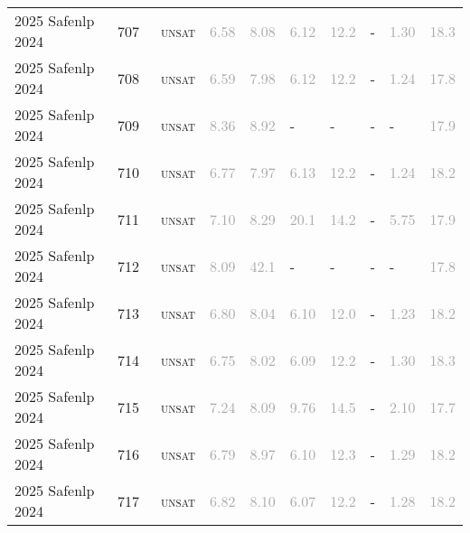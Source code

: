 \begin{center}
{\begin{longtable}{@{}llllllllll@{}}
2025 Safenlp 2024 & 707 & ~\textsc{unsat} & \textcolor{darkgray}{6.58} & \textcolor{darkgray}{8.08} & \textcolor{darkgray}{6.12} & \textcolor{darkgray}{12.2} & - & \textcolor{darkgray}{1.30} & \textcolor{darkgray}{18.3} \\
2025 Safenlp 2024 & 708 & ~\textsc{unsat} & \textcolor{darkgray}{6.59} & \textcolor{darkgray}{7.98} & \textcolor{darkgray}{6.12} & \textcolor{darkgray}{12.2} & - & \textcolor{darkgray}{1.24} & \textcolor{darkgray}{17.8} \\
2025 Safenlp 2024 & 709 & ~\textsc{unsat} & \textcolor{darkgray}{8.36} & \textcolor{darkgray}{8.92} & - & - & - & - & \textcolor{darkgray}{17.9} \\
2025 Safenlp 2024 & 710 & ~\textsc{unsat} & \textcolor{darkgray}{6.77} & \textcolor{darkgray}{7.97} & \textcolor{darkgray}{6.13} & \textcolor{darkgray}{12.2} & - & \textcolor{darkgray}{1.24} & \textcolor{darkgray}{18.2} \\
2025 Safenlp 2024 & 711 & ~\textsc{unsat} & \textcolor{darkgray}{7.10} & \textcolor{darkgray}{8.29} & \textcolor{darkgray}{20.1} & \textcolor{darkgray}{14.2} & - & \textcolor{darkgray}{5.75} & \textcolor{darkgray}{17.9} \\
2025 Safenlp 2024 & 712 & ~\textsc{unsat} & \textcolor{darkgray}{8.09} & \textcolor{darkgray}{42.1} & - & - & - & - & \textcolor{darkgray}{17.8} \\
2025 Safenlp 2024 & 713 & ~\textsc{unsat} & \textcolor{darkgray}{6.80} & \textcolor{darkgray}{8.04} & \textcolor{darkgray}{6.10} & \textcolor{darkgray}{12.0} & - & \textcolor{darkgray}{1.23} & \textcolor{darkgray}{18.2} \\
2025 Safenlp 2024 & 714 & ~\textsc{unsat} & \textcolor{darkgray}{6.75} & \textcolor{darkgray}{8.02} & \textcolor{darkgray}{6.09} & \textcolor{darkgray}{12.2} & - & \textcolor{darkgray}{1.30} & \textcolor{darkgray}{18.3} \\
2025 Safenlp 2024 & 715 & ~\textsc{unsat} & \textcolor{darkgray}{7.24} & \textcolor{darkgray}{8.09} & \textcolor{darkgray}{9.76} & \textcolor{darkgray}{14.5} & - & \textcolor{darkgray}{2.10} & \textcolor{darkgray}{17.7} \\
2025 Safenlp 2024 & 716 & ~\textsc{unsat} & \textcolor{darkgray}{6.79} & \textcolor{darkgray}{8.97} & \textcolor{darkgray}{6.10} & \textcolor{darkgray}{12.3} & - & \textcolor{darkgray}{1.29} & \textcolor{darkgray}{18.2} \\
2025 Safenlp 2024 & 717 & ~\textsc{unsat} & \textcolor{darkgray}{6.82} & \textcolor{darkgray}{8.10} & \textcolor{darkgray}{6.07} & \textcolor{darkgray}{12.2} & - & \textcolor{darkgray}{1.28} & \textcolor{darkgray}{18.2} \\

\end{longtable}}
\end{center}
